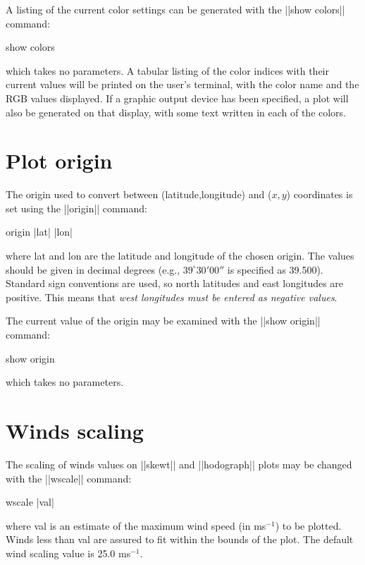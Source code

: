 A listing of the current color settings can be generated with the
||show colors|| command:
\begin{example}
	show colors
\end{example}
which takes no parameters.  A tabular listing of the color indices with their
current values will be printed on the user's terminal, with the color name
and the RGB values displayed.  If a graphic output device has been specified,
a plot will also be generated on that display, with some text written in each
of the colors.

\section{Plot origin}
The origin used to convert between (latitude,longitude) and 
($x,y$) coordinates is set using the ||origin|| command:
\begin{example}
	origin |lat| |lon|
\end{example}
where {\pf lat} and {\pf lon} are the latitude and longitude of the chosen
origin.  The values should be given in decimal degrees (e.g., 
$39^\circ 30'00''$ is specified as 39.500).  Standard sign conventions are 
used, so north latitudes and east longitudes are positive.  This means that
{\em west longitudes must be entered as negative values}.

The current value of the origin may be examined with the ||show origin||
command:
\begin{example}
	show origin
\end{example}
which takes no parameters.

\section{Winds scaling}
The scaling of winds values on ||skewt|| and ||hodograph|| plots may be 
changed with the ||wscale|| command:
\begin{example}
	wscale |val|
\end{example}
where {\pf val} is an estimate of the maximum wind speed (in ms$^{-1}$) to
be plotted.  Winds less than {\pf val} are assured to fit within the bounds
of the plot.  The default wind scaling value is 25.0 ms$^{-1}$.

